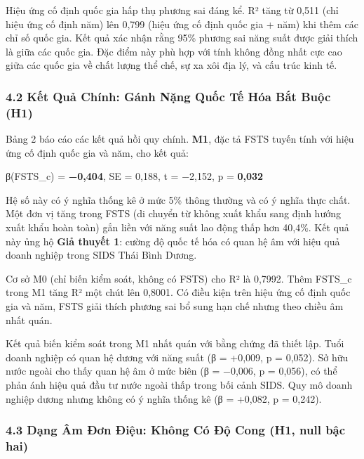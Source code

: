 \documentclass[12pt,a4paper]{article}
\begin{document}
Hiệu ứng cố định quốc gia hấp thụ phương sai đáng kể. R² tăng từ 0,511
(chỉ hiệu ứng cố định năm) lên 0,799 (hiệu ứng cố định quốc gia + năm)
khi thêm các chỉ số quốc gia. Kết quả xác nhận rằng 95\% phương sai năng
suất được giải thích là giữa các quốc gia. Đặc điểm này phù hợp với tính
không đồng nhất cực cao giữa các quốc gia về chất lượng thể chế, sự xa
xôi địa lý, và cấu trúc kinh tế.

\hypertarget{42-kux1ebft-quux1ea3-chuxednh-guxe1nh-nux1eb7ng-quux1ed1c-tux1ebf-huxf3a-bux1eaft-buux1ed9c-h1}{%
\subsubsection{4.2 Kết Quả Chính: Gánh Nặng Quốc Tế Hóa Bắt Buộc
(H1)}\label{42-kux1ebft-quux1ea3-chuxednh-guxe1nh-nux1eb7ng-quux1ed1c-tux1ebf-huxf3a-bux1eaft-buux1ed9c-h1}}

Bảng 2 báo cáo các kết quả hồi quy chính. \textbf{M1}, đặc tả FSTS tuyến
tính với hiệu ứng cố định quốc gia và năm, cho kết quả:

β(FSTS\_c) = \textbf{−0,404}, SE = 0,188, t = −2,152, p = \textbf{0,032}

Hệ số này có ý nghĩa thống kê ở mức 5\% thông thường và có ý nghĩa thực
chất. Một đơn vị tăng trong FSTS (di chuyển từ không xuất khẩu sang định
hướng xuất khẩu hoàn toàn) gắn liền với năng suất lao động thấp hơn
40,4\%. Kết quả này ủng hộ \textbf{Giả thuyết 1}: cường độ quốc tế hóa
có quan hệ âm với hiệu quả doanh nghiệp trong SIDS Thái Bình Dương.

Cơ sở M0 (chỉ biến kiểm soát, không có FSTS) cho R² là 0,7992. Thêm
FSTS\_c trong M1 tăng R² một chút lên 0,8001. Có điều kiện trên hiệu ứng
cố định quốc gia và năm, FSTS giải thích phương sai bổ sung hạn chế
nhưng theo chiều âm nhất quán.

Kết quả biến kiểm soát trong M1 nhất quán với bằng chứng đã thiết lập.
Tuổi doanh nghiệp có quan hệ dương với năng suất (β = +0,009, p =
0,052). Sở hữu nước ngoài cho thấy quan hệ âm ở mức biên (β = −0,006, p
= 0,056), có thể phản ánh hiệu quả đầu tư nước ngoài thấp trong bối cảnh
SIDS. Quy mô doanh nghiệp dương nhưng không có ý nghĩa thống kê (β =
+0,082, p = 0,242).

\hypertarget{43-dux1ea1ng-uxe2m-ux111ux1a1n-ux111iux1ec7u-khuxf4ng-cuxf3-ux111ux1ed9-cong-h1-null-bux1eadc-hai}{%
\subsubsection{4.3 Dạng Âm Đơn Điệu: Không Có Độ Cong (H1, null bậc
hai)}\label{43-dux1ea1ng-uxe2m-ux111ux1a1n-ux111iux1ec7u-khuxf4ng-cuxf3-ux111ux1ed9-cong-h1-null-bux1eadc-hai}}
\end{document}
